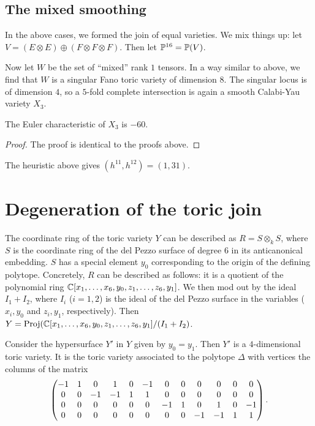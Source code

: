 \subsection{The mixed smoothing}

In the above cases, we formed the join of equal varieties. We mix things up: let $V=(E \otimes E) \oplus (F \otimes F \otimes F)$. Then let $\P^{16}=\P(V)$.

Now let $W$ be the set of ``mixed'' rank $1$ tensors. In a way similar to above, we find that $W$ is a singular Fano toric variety of dimension $8$. The singular locus is of dimension $4$, so a $5$-fold complete intersection is again a smooth Calabi-Yau variety $X_3$.

\begin{proposition}
The Euler characteristic of $X_3$ is $-60$.
\end{proposition}
\begin{proof}
The proof is identical to the proofs above.
\end{proof}

\begin{remark}
The heuristic above gives $(h^{11},h^{12})=(1,31)$.
\end{remark}



\section{Degeneration of the toric join}

The coordinate ring of the toric variety $Y$ can be described as $R = S \otimes_k S$, where $S$ is the coordinate ring of the del Pezzo surface of degree $6$ in its anticanonical embedding. $S$ has a special element $y_0$ corresponding to the origin of the defining polytope. Concretely, $R$ can be described as follows: it is a quotient of the polynomial ring $\C[x_1,\ldots,x_6,y_0,z_1,\ldots,z_6,y_1]$. We then mod out by the ideal $I_1 + I_2$, where $I_i$ ($i=1,2$) is the ideal of the del Pezzo surface in the variables ($x_i,y_0$ and $z_i,y_1$, respectively). Then $Y=\Proj(\C[x_1,\ldots,x_6,y_0,z_1,\ldots,z_6,y_1]/(I_1+I_2)$.

Consider the hypersurface $Y'$ in $Y$ given by $y_0=y_1$. Then $Y'$ is a $4$-dimensional toric variety. It is the toric variety associated to the polytope $\Delta$ with vertices the columns of the matrix
\[
 \makeatletter\c@MaxMatrixCols=12\makeatother\begin{pmatrix}{-1}&      1&      0&      1&      0&      {-1}&      0&      0&      0&      0&      0&      0\\      0&      0&      {-1}&      {-1}&      1&      1&      0&      0&      0&      0&      0&      0\\      0&      0&      0&      0&      0&      0&      {-1}&      1&      0&      1&      0&      {-1}\\      0&      0&      0&      0&      0&      0&      0&      0&      {-1}&      {-1}&      1&      1\\      \end{pmatrix}.
\]

